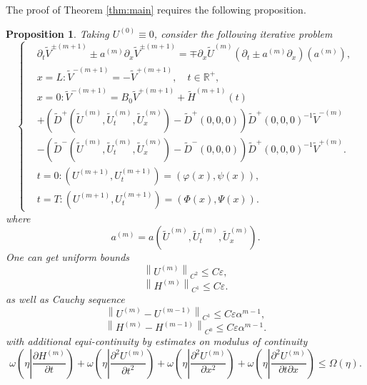 \documentclass[a4paper,reqno,11pt]{amsart}
\numberwithin{equation}{section} %
\newtheorem{prop}[lem]{Proposition}
\begin{document}
The proof of Theorem \ref{thm:main} requires the following proposition.
\begin{prop}\label{prop:main}
	Taking $U^{(0)}\equiv 0$, consider the following iterative problem
	\begin{equation}
		\begin{cases}
		& \partial_t \widetilde{V}^{ \pm(m+1)} \pm a^{(m)} \partial_x \widetilde{V}^{ \pm(m+1)}=\mp \partial_x \widetilde{U}^{(m)}\left(\partial_t \pm a^{(m)} \partial_x\right)\left(a^{(m)}\right), \\
		& x=L: \widetilde{V}^{-(m+1)}=-\widetilde{V}^{+(m+1)}, \quad t \in \mathbb{R}^{+}, \\
		& x=0: \widetilde{V}^{-(m+1)}=B_0 \widetilde{V}^{+(m+1)}+\widetilde{H}^{(m+1)}(t) \\
		& +\left(\widetilde{D}^{+}\left(\widetilde{U}^{(m)}, \widetilde{U}_t^{(m)}, \widetilde{U}_x^{(m)}\right)-\widetilde{D}^{+}(0,0,0)\right) \widetilde{D}^{+}(0,0,0)^{-1} \widetilde{V}^{-(m)} \\
		& -\left(\widetilde{D}^{-}\left(\widetilde{U}^{(m)}, \widetilde{U}_t^{(m)}, \widetilde{U}_x^{(m)}\right)-\widetilde{D}^{-}(0,0,0)\right) \widetilde{D}^{+}(0,0,0)^{-1} \widetilde{V}^{+(m)}.\\
		& t=0:\left( U^{(m+1)},U^{(m+1)}_t \right) =\left( \varphi  \left( x \right) ,\psi \left( x \right) \right)  ,\\
		& t=T:\left( U^{(m+1)},U^{(m+1)}_t \right) =\left( \varPhi   \left( x \right) ,\varPsi  \left( x \right) \right) .
	\end{cases}	
	\end{equation}
where
$$
a^{(m)}=a\left(\widetilde{U}^{(m)}, \widetilde{U}_t^{(m)}, \widetilde{U}_x^{(m)}\right) .
$$
One can get uniform bounds
$$
 \left\lVert U^{\left( m \right)}\right\rVert  _{C^2}\leq C\varepsilon ,
$$
$$
 \left\lVert H^{\left( m \right)}\right\rVert  _{C^1}\leq C\varepsilon .
$$
as well as Cauchy sequence 
$$
\left\lVert  U^{\left( m \right)}-U^{\left( m-1 \right)}\right\rVert  _{C^1}\leq C\varepsilon \alpha ^{m-1},
$$
$$
\left\lVert  H^{\left( m \right)}-H^{\left( m-1 \right)}\right\rVert  _{C^0}\leq C\varepsilon \alpha ^{m-1}.
$$
with additional equi-continuity by estimates on modulus of continuity
$$
\omega \left( \eta \left| \frac{\partial H^{\left( m \right)}}{\partial t} \right. \right) +\omega \left(  \eta \left|\frac{\partial ^2U^{\left( m \right)}}{\partial t^2} \right. \right) +\omega \left( \eta \left|\frac{\partial ^2U^{\left( m \right)}}{\partial x^2} \right.  \right) +\omega \left( \eta \left|\frac{\partial ^2U^{\left( m \right)}}{\partial t\partial x} \right. \right) \leq \Omega \left( \eta \right) .
$$
\end{prop}
\end{document}
